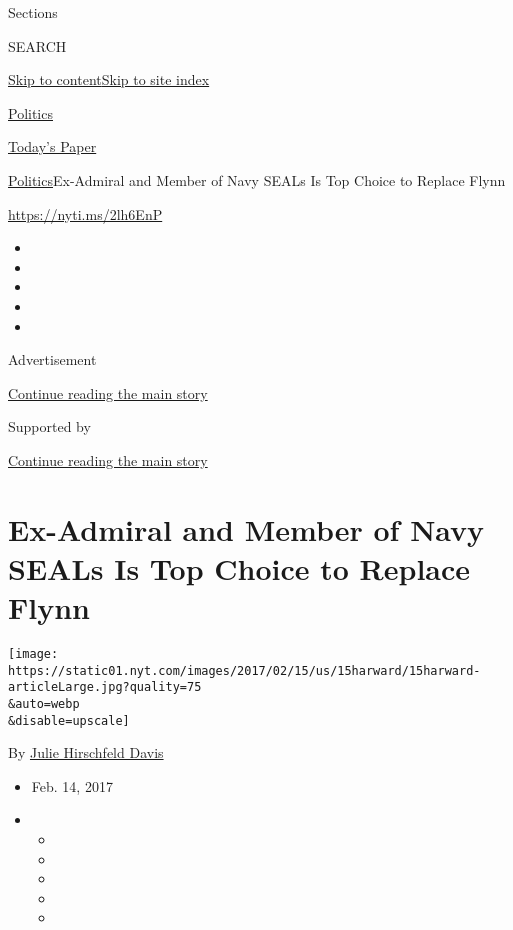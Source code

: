 Sections

SEARCH

\protect\hyperlink{site-content}{Skip to
content}\protect\hyperlink{site-index}{Skip to site index}

\href{https://www.nytimes.com/section/politics}{Politics}

\href{https://myaccount.nytimes.com/auth/login?response_type=cookie\&client_id=vi}{}

\href{https://www.nytimes.com/section/todayspaper}{Today's Paper}

\href{/section/politics}{Politics}\textbar{}Ex-Admiral and Member of
Navy SEALs Is Top Choice to Replace Flynn

\url{https://nyti.ms/2lh6EnP}

\begin{itemize}
\item
\item
\item
\item
\item
\end{itemize}

Advertisement

\protect\hyperlink{after-top}{Continue reading the main story}

Supported by

\protect\hyperlink{after-sponsor}{Continue reading the main story}

\hypertarget{ex-admiral-and-member-of-navy-seals-is-top-choice-to-replace-flynn}{%
\section{Ex-Admiral and Member of Navy SEALs Is Top Choice to Replace
Flynn}\label{ex-admiral-and-member-of-navy-seals-is-top-choice-to-replace-flynn}}

\texttt{[image: https://static01.nyt.com/images/2017/02/15/us/15harward/15harward-articleLarge.jpg?quality=75\\\&auto=webp\\\&disable=upscale]}

By \href{https://www.nytimes.com/by/julie-hirschfeld-davis}{Julie
Hirschfeld Davis}

\begin{itemize}
\item
  Feb. 14, 2017
\item
  \begin{itemize}
  \item
  \item
  \item
  \item
  \item
  \end{itemize}
\end{itemize}

